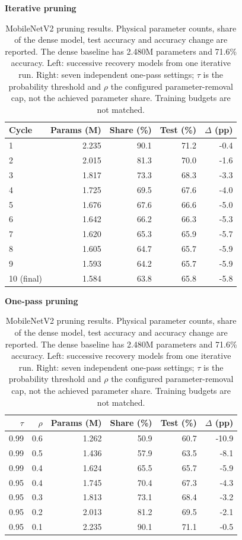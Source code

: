 
\begin{table}[t]
\centering\small\setlength{\tabcolsep}{3pt}
\caption{MobileNetV2 pruning results. Physical parameter counts, share of the dense model, test accuracy and accuracy change are reported. The dense baseline has 2.480M parameters and 71.6\% accuracy. Left: successive recovery models from one iterative run. Right: seven independent one-pass settings; $\tau$ is the probability threshold and $\rho$ the configured parameter-removal cap, not the achieved parameter share. Training budgets are not matched.}
\label{tab:mbv2-tin-all}
\begin{minipage}[t]{0.47\textwidth}\centering
\textbf{Iterative pruning}\par\smallskip
\begin{tabular}{@{}lrrrr@{}}\toprule
Cycle & Params (M) & Share (\%) & Test (\%) & $\Delta$ (pp) \\\midrule
1 & 2.235 & 90.1 & 71.2 & -0.4 \\
2 & 2.015 & 81.3 & 70.0 & -1.6 \\
3 & 1.817 & 73.3 & 68.3 & -3.3 \\
4 & 1.725 & 69.5 & 67.6 & -4.0 \\
5 & 1.676 & 67.6 & 66.6 & -5.0 \\
6 & 1.642 & 66.2 & 66.3 & -5.3 \\
7 & 1.620 & 65.3 & 65.9 & -5.7 \\
8 & 1.605 & 64.7 & 65.7 & -5.9 \\
9 & 1.593 & 64.2 & 65.7 & -5.9 \\
10 (final) & 1.584 & 63.8 & 65.8 & -5.8 \\
\bottomrule\end{tabular}\end{minipage}\hfill
\begin{minipage}[t]{0.51\textwidth}\centering
\textbf{One-pass pruning}\par\smallskip
\begin{tabular}{@{}rrrrrr@{}}\toprule
$\tau$ & $\rho$ & Params (M) & Share (\%) & Test (\%) & $\Delta$ (pp) \\\midrule
0.99 & 0.6 & 1.262 & 50.9 & 60.7 & -10.9 \\
0.99 & 0.5 & 1.436 & 57.9 & 63.5 & -8.1 \\
0.99 & 0.4 & 1.624 & 65.5 & 65.7 & -5.9 \\
0.95 & 0.4 & 1.745 & 70.4 & 67.3 & -4.3 \\
0.95 & 0.3 & 1.813 & 73.1 & 68.4 & -3.2 \\
0.95 & 0.2 & 2.013 & 81.2 & 69.5 & -2.1 \\
0.95 & 0.1 & 2.235 & 90.1 & 71.1 & -0.5 \\
\bottomrule\end{tabular}\end{minipage}
\end{table}
